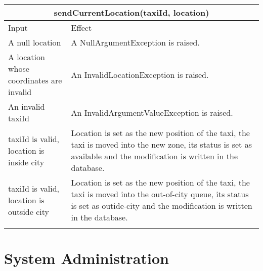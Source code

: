 \documentclass[11pt,oneside,a4paper]{report}
\begin{document}
\begin{tabular}{p{5cm}|p{6cm}}
	\multicolumn{2}{c}{sendCurrentLocation(taxiId, location)}\\\hline
	Input & Effect \\\hline
	A null location &
	A NullArgumentException is raised. \\\hline
	A location whose coordinates are invalid &
	An InvalidLocationException is raised. \\\hline
	An invalid taxiId &
	An InvalidArgumentValueException is raised. \\\hline
	taxiId is valid, location is inside city&
	Location is set as the new position of the taxi, the taxi is moved into the new zone, its status is set as available and the modification is written in the database.\\\hline
	taxiId is valid, location is outside city&
	Location is set as the new position of the taxi, the taxi is moved into the out-of-city queue, its status is set as outide-city and the modification is written in the database. \\\hline\\\hline

	
\end{tabular}


\chapter{System Administration}
\end{document}

